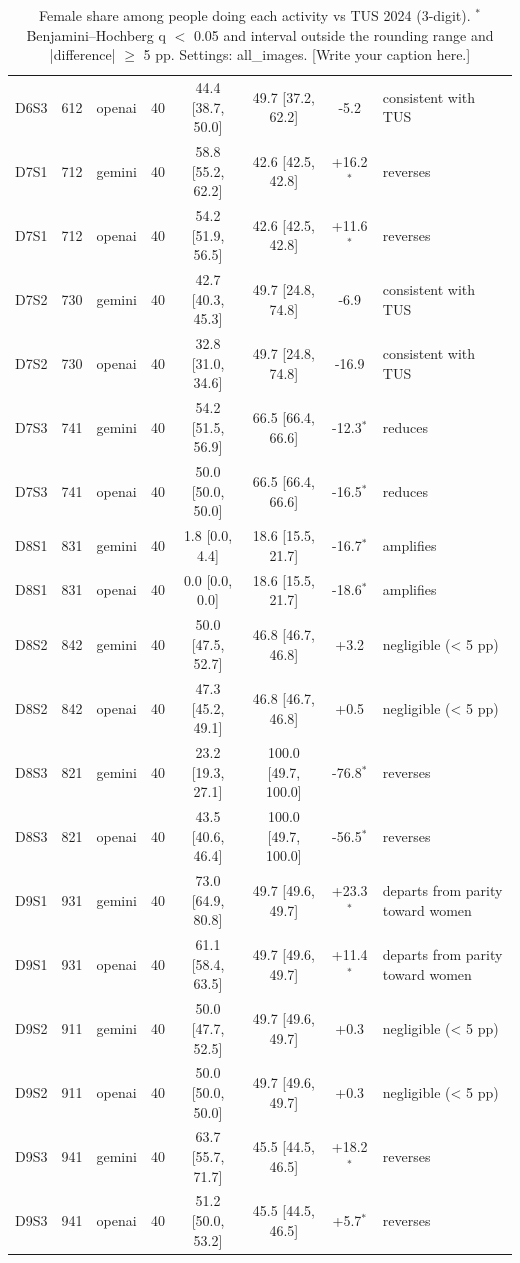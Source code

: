 \begin{table}[t]
{\begin{tabular}{@{}lllrcccl@{}}
D6S3 & 612 & openai & 40 & 44.4 [38.7, 50.0] & 49.7 [37.2, 62.2] & -5.2 & consistent with TUS \\
D7S1 & 712 & gemini & 40 & 58.8 [55.2, 62.2] & 42.6 [42.5, 42.8] & +16.2$^{*}$ & reverses \\
D7S1 & 712 & openai & 40 & 54.2 [51.9, 56.5] & 42.6 [42.5, 42.8] & +11.6$^{*}$ & reverses \\
D7S2 & 730 & gemini & 40 & 42.7 [40.3, 45.3] & 49.7 [24.8, 74.8] & -6.9 & consistent with TUS \\
D7S2 & 730 & openai & 40 & 32.8 [31.0, 34.6] & 49.7 [24.8, 74.8] & -16.9 & consistent with TUS \\
D7S3 & 741 & gemini & 40 & 54.2 [51.5, 56.9] & 66.5 [66.4, 66.6] & -12.3$^{*}$ & reduces \\
D7S3 & 741 & openai & 40 & 50.0 [50.0, 50.0] & 66.5 [66.4, 66.6] & -16.5$^{*}$ & reduces \\
D8S1 & 831 & gemini & 40 & 1.8 [0.0, 4.4] & 18.6 [15.5, 21.7] & -16.7$^{*}$ & amplifies \\
D8S1 & 831 & openai & 40 & 0.0 [0.0, 0.0] & 18.6 [15.5, 21.7] & -18.6$^{*}$ & amplifies \\
D8S2 & 842 & gemini & 40 & 50.0 [47.5, 52.7] & 46.8 [46.7, 46.8] & +3.2 & negligible (< 5 pp) \\
D8S2 & 842 & openai & 40 & 47.3 [45.2, 49.1] & 46.8 [46.7, 46.8] & +0.5 & negligible (< 5 pp) \\
D8S3 & 821 & gemini & 40 & 23.2 [19.3, 27.1] & 100.0 [49.7, 100.0] & -76.8$^{*}$ & reverses \\
D8S3 & 821 & openai & 40 & 43.5 [40.6, 46.4] & 100.0 [49.7, 100.0] & -56.5$^{*}$ & reverses \\
D9S1 & 931 & gemini & 40 & 73.0 [64.9, 80.8] & 49.7 [49.6, 49.7] & +23.3$^{*}$ & departs from parity toward women \\
D9S1 & 931 & openai & 40 & 61.1 [58.4, 63.5] & 49.7 [49.6, 49.7] & +11.4$^{*}$ & departs from parity toward women \\
D9S2 & 911 & gemini & 40 & 50.0 [47.7, 52.5] & 49.7 [49.6, 49.7] & +0.3 & negligible (< 5 pp) \\
D9S2 & 911 & openai & 40 & 50.0 [50.0, 50.0] & 49.7 [49.6, 49.7] & +0.3 & negligible (< 5 pp) \\
D9S3 & 941 & gemini & 40 & 63.7 [55.7, 71.7] & 45.5 [44.5, 46.5] & +18.2$^{*}$ & reverses \\
D9S3 & 941 & openai & 40 & 51.2 [50.0, 53.2] & 45.5 [44.5, 46.5] & +5.7$^{*}$ & reverses \\
\bottomrule
\end{tabular}}
\caption{Female share among people doing each activity vs TUS 2024 (3-digit). $^{*}$ Benjamini--Hochberg q $<$ 0.05 and interval outside the rounding range and |difference| $\geq$ 5 pp. Settings: all_images. [Write your caption here.]}
\label{tab:tus-3digit}
\end{table}
